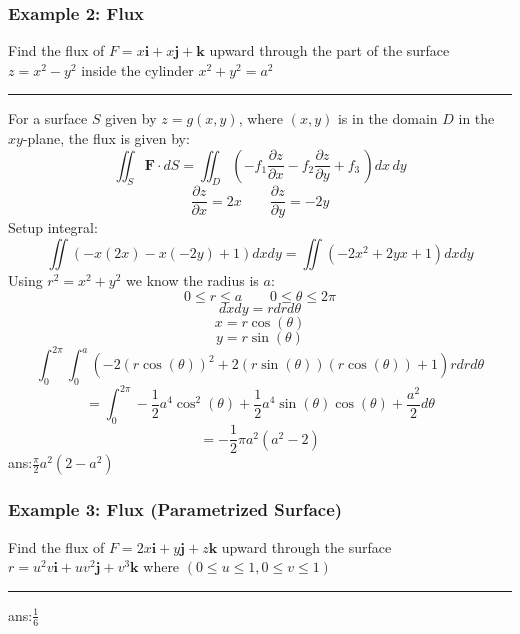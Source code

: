 \subsubsection{Example 2: Flux}
Find the flux of $F=x\mathbf{i}+x\mathbf{j}+\mathbf{k}$ upward through the part of the surface $z=x^2-y^2$
inside the cylinder $x^2+y^2=a^2$

\rule{\textwidth}{0.5pt}

For a surface $S$ given by $z=g(x,y)$, where $(x,y)$ is in the domain $D$ in the $xy$-plane, the flux is given by:
$$\iint_{S}\mathbf{F}\cdot d S=\iint_D\left(-f_{1}\frac{\partial z}{\partial x}-f_{2}\frac{\partial z}{\partial y}+f_{3}\,\right)d x\,d y$$
$$\frac{\partial z}{\partial x}=2x\qquad\frac{\partial z}{\partial y}=-2y$$
Setup integral:
$$\iint (-x(2x)-x(-2y)+1)dxdy=\iint (-2x^2+2yx+1)dxdy$$
Using $r^2=x^2+y^2$ we know the radius is $a$:
$$0\leq r\leq a\qquad 0\leq \theta\leq 2\pi$$
$$dxdy=rdrd\theta$$
$$x=r\cos(\theta)$$
$$y=r\sin(\theta)$$
$$\int_0^{2\pi}\int_0^{a} (-2(r\cos(\theta))^2+2(r\sin(\theta))(r\cos(\theta))+1)rdrd\theta$$
$$=\int_0^{2\pi}-\frac{1}{2} a^4 \cos ^2(\theta)+\frac{1}{2} a^4 \sin (\theta) \cos (\theta)+\frac{a^2}{2}d\theta$$
$$=-\frac{1}{2} \pi  a^2 \left(a^2-2\right)$$
ans:$\frac{\pi}{2}a^{2}(2-a^{2})$

\subsubsection{Example 3: Flux (Parametrized Surface)}
Find the flux of $F=2x\mathbf{i}+y\mathbf{j}+z\mathbf{k}$ upward through the surface $r=u^2v\mathbf{i}+uv^2\mathbf{j}+v^3\mathbf{k}$ where $(0\leq u\leq1,0\leq v\leq1)$ 

\rule{\textwidth}{0.5pt}

ans:$\frac{1}{6}$

%
%
%

